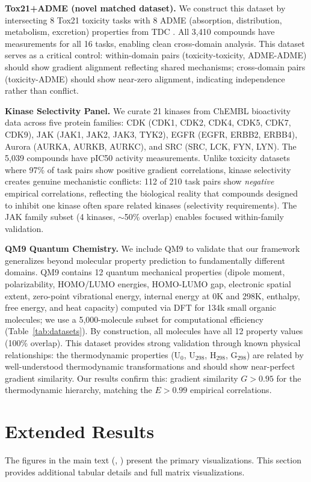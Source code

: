 \documentclass[sigconf,nonacm]{acmart}
\begin{document}
\textbf{Tox21+ADME (novel matched dataset).} We construct this dataset by intersecting 8 Tox21 toxicity tasks with 8 ADME (absorption, distribution, metabolism, excretion) properties from TDC \cite{huang2021therapeutics}. All 3,410 compounds have measurements for all 16 tasks, enabling clean cross-domain analysis. This dataset serves as a critical control: within-domain pairs (toxicity-toxicity, ADME-ADME) should show gradient alignment reflecting shared mechanisms; cross-domain pairs (toxicity-ADME) should show near-zero alignment, indicating independence rather than conflict.

\textbf{Kinase Selectivity Panel.} We curate 21 kinases from ChEMBL \cite{gaulton2012chembl} bioactivity data across five protein families: CDK (CDK1, CDK2, CDK4, CDK5, CDK7, CDK9), JAK (JAK1, JAK2, JAK3, TYK2), EGFR (EGFR, ERBB2, ERBB4), Aurora (AURKA, AURKB, AURKC), and SRC (SRC, LCK, FYN, LYN). The 5,039 compounds have pIC50 activity measurements. Unlike toxicity datasets where 97\% of task pairs show positive gradient correlations, kinase selectivity creates genuine mechanistic conflicts: 112 of 210 task pairs show \textit{negative} empirical correlations, reflecting the biological reality that compounds designed to inhibit one kinase often spare related kinases (selectivity requirements). The JAK family subset (4 kinases, $\sim$50\% overlap) enables focused within-family validation.

\textbf{QM9 Quantum Chemistry.} We include QM9 to validate that our framework generalizes beyond molecular property prediction to fundamentally different domains. QM9 contains 12 quantum mechanical properties (dipole moment, polarizability, HOMO/LUMO energies, HOMO-LUMO gap, electronic spatial extent, zero-point vibrational energy, internal energy at 0K and 298K, enthalpy, free energy, and heat capacity) computed via DFT for 134k small organic molecules; we use a 5,000-molecule subset for computational efficiency (Table~\ref{tab:datasets}). By construction, all molecules have all 12 property values (100\% overlap). This dataset provides strong validation through known physical relationships: the thermodynamic properties (U$_0$, U$_{298}$, H$_{298}$, G$_{298}$) are related by well-understood thermodynamic transformations and should show near-perfect gradient similarity. Our results confirm this: gradient similarity $G > 0.95$ for the thermodynamic hierarchy, matching the $E > 0.99$ empirical correlations.

\section{Extended Results}
The figures in the main text (, ) present the primary visualizations. This section provides additional tabular details and full matrix visualizations.
\end{document}
